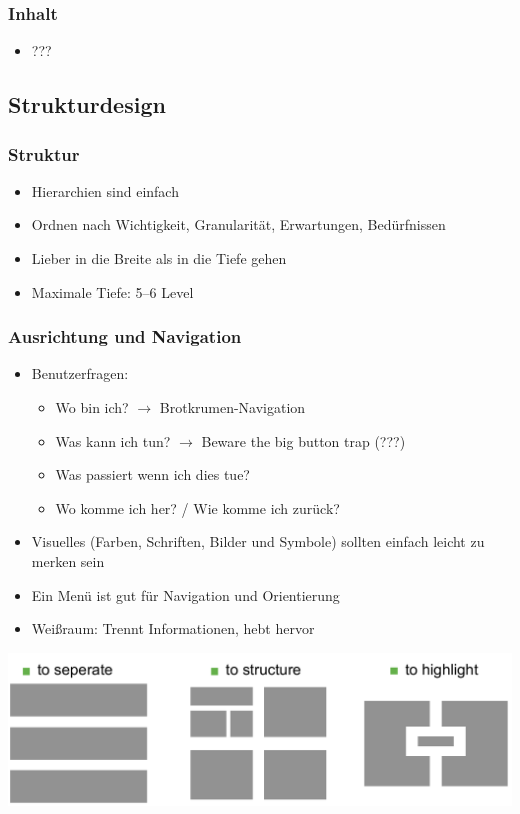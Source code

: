 \documentclass[a4paper,10pt]{article}
\begin{document}
\subsubsection{Inhalt}
\begin{itemize}
	\item ???
\end{itemize}

\subsection{Strukturdesign}
\subsubsection{Struktur}
\begin{itemize}
	\item Hierarchien sind einfach
	\item Ordnen nach Wichtigkeit, Granularität, Erwartungen, Bedürfnissen
	\item Lieber in die Breite als in die Tiefe gehen
	\item Maximale Tiefe: 5--6 Level
\end{itemize}

\subsubsection{Ausrichtung und Navigation}
\begin{itemize}
	\item Benutzerfragen:
	\begin{itemize}
		\item Wo bin ich? $\rightarrow$ Brotkrumen-Navigation
		\item Was kann ich tun? $\rightarrow$ Beware the big button trap (???)
		\item Was passiert wenn ich dies tue?
		\item Wo komme ich her? / Wie komme ich zurück?
	\end{itemize}
	\item Visuelles (Farben, Schriften, Bilder und Symbole) sollten einfach leicht zu merken sein
	\item Ein Menü ist gut für Navigation und Orientierung
	\item Weißraum: Trennt Informationen, hebt hervor
\end{itemize}
\includegraphics[width=\textwidth]{inc/whitespace.pdf}
\end{document}
